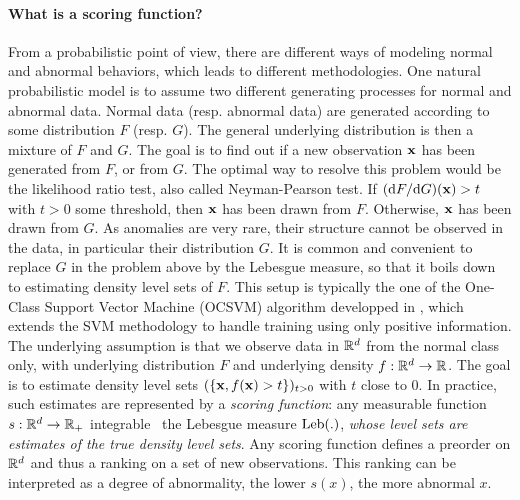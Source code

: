 \paragraph{What is a scoring function?}
From a probabilistic point of view, there are different ways of modeling normal and abnormal behaviors, which leads to different methodologies. One natural probabilistic model is to assume two different generating processes for normal and abnormal data. Normal data (resp. abnormal data) are generated according to some distribution $F$ (resp. $G$). The general underlying distribution is then a mixture of $F$ and $G$. The goal is to find out if a new observation $\mathbf x$ has been generated from $F$, or from $G$. The optimal way to resolve %
this problem would be the likelihood ratio test, also called Neyman-Pearson test. If $(\mathrm{d}  F / \mathrm{d}  G) ( \mathbf x) > t$ with $t>0$ some threshold, then $\mathbf x$ has been drawn from $F$. Otherwise, $\mathbf x$ has been drawn from $G$. %
%
As anomalies are very rare, their structure cannot be observed in the data, in particular their distribution $G$. 
%
It is common and convenient \cite{Vert06thesis} to replace $G$ in the problem above by the Lebesgue measure, so that it boils down to estimating density level sets of $F$. 
%
This setup is typically the one of the One-Class Support Vector Machine (OCSVM) algorithm developped in \cite{Scholkopf2001}, which extends the SVM methodology \cite{Cortes1995, Shawe2004} to handle training using only positive information.
The underlying assumption is that we observe data in $\mathbb{R}^d$ from the normal class only, with underlying distribution $F$ and underlying density $f: \mathbb{R}^d \to \mathbb{R}$. The goal is to estimate density level sets $(\{\mathbf x, f( \mathbf x) > t\})_{t>0}$ with $t$ close to $0$.
%
In practice, such estimates are represented by a \emph{scoring function}: any measurable function $s: \mathbb{R}^d \to \mathbb{R}_+$ integrable \wrt~the Lebesgue measure $\text{Leb}(.)$, \emph{whose level sets are estimates of the true density level sets}. 
Any scoring function defines a preorder on $\mathbb{R}^d$ and thus a ranking on a set of new observations. This ranking can be interpreted as a degree of abnormality, the lower $s(x)$, the more abnormal $x$. 
